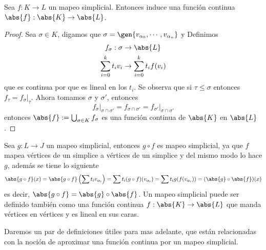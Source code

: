 \documentclass{article}
\begin{document}
\vspace{2mm}
\begin{lema}
    Sea $f:K\to L$ un mapeo simplicial. Entonces induce una función continua 
    $\abs{f}:\abs{K}\to\abs{L}$.
\end{lema}
\begin{proof}
    Sea $\sigma\in K$, digamos que $\sigma=\gen{v_{\alpha_{0}},\cdots,v_{\alpha_{n}}}$ y Definimos
    \begin{align*}
        f_{\sigma}:\sigma &\to \abs{L} \\
        \sum_{i=0}^{k}t_{i}v_{i} &\to \sum_{i=0}^{k}t_{i}f(v_{i})
    \end{align*}
    que es continua por que es lineal en los $t_{i}$. Se observa que si $\tau\leq\sigma$ entonces
    $f_{\tau}=f_{\sigma}\big|_{\tau}$. Ahora tomamos $\sigma$ y $\sigma'$, entonces
    \begin{equation*}
        f_{\sigma}\big|_{\sigma\cap\sigma'}=f_{\sigma\cap\sigma'}
        =f_{\sigma'}\big|_{\sigma\cap\sigma'}
    \end{equation*}
    entonces $\abs{f}:=\bigcup_{\sigma\in K}f_{\sigma}$ es una función continua de $\abs{K}$ en 
    $\abs{L}$.
\end{proof}
\noindent Sea $g:L\to J$ un mapeo simplicial, entonces $g\circ f$ es mapeo simplicial, ya que $f$
mapea vértices de un simplice a vértices de un simplice y del mismo modo lo hace $g$, además se 
tiene lo siguiente
\begin{equation*}
    \abs{g\circ f}(x)=\abs{g\circ f}\left(\sum t_{i}v_{\alpha_{i}}\right)
    =\sum t_{i}(g\circ f)(v_{\alpha_{i}})=\sum t_{i}g(f(v_{\alpha_{i}}))=(\abs{g}\circ\abs{f})(x)
\end{equation*}
es decir, $\abs{g\circ f}=\abs{g}\circ\abs{f}$. Un mapeo simplicial puede ser definido también 
como una función continua $f:\abs{K}\to\abs{L}$ que manda vértices en vértices y es lineal en sus 
caras.

\vspace{2mm}
\noindent Daremos un par de definiciones útiles para mas adelante, que están relacionadas con la 
noción de aproximar una función continua por un mapeo simplicial.
\end{document}
